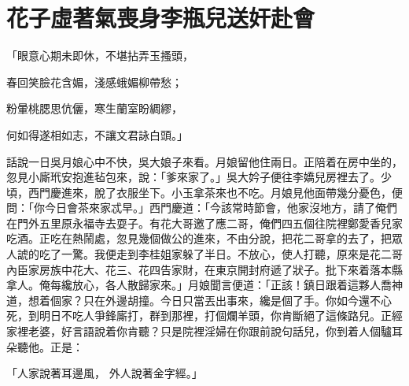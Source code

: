 %

\chapter{花子虛著氣喪身\KG 李瓶兒送奸赴會}

\begin{showcontents}{}



「眼意心期未即休，不堪拈弄玉搔頭，

春回笑臉花含媚，淺感蛾媚柳帶愁；

粉暈桃腮思伉儷，寒生蘭室盼綢繆，

何如得遂相如志，不讓文君詠白頭。」

話說一日吳月娘心中不快，吳大娘子來看。月娘留他住兩日。正陪着在房中坐的，忽見小廝玳安抱進毡包來，說：「爹來家了。」吳大妗子便往李嬌兒房裡去了。少頃，西門慶進來，脫了衣服坐下。小玉拿茶來也不吃。月娘見他面帶幾分憂色，便問：「你今日會茶來家忒早。」西門慶道：「今該常時節會，他家沒地方，請了俺們在門外五里原永福寺去耍子。有花大哥邀了應二哥，俺們四五個往院裡鄭愛香兒家吃酒。正吃在熱鬧處，忽見幾個做公的進來，不由分說，把花二哥拿的去了，把眾人諕的吃了一驚。我便走到李桂姐家躲了半日。不放心，使人打聽，原來是花二哥內臣家房族中花大、花三、花四告家財，在東京開封府遞了狀子。批下來着落本縣拿人。俺每纔放心，各人散歸家來。」月娘聞言便道：「正該！鎮日跟着這夥人喬神道，想着個家？只在外邊胡撞。今日只當丟出事來，纔是個了手。你如今還不心死，到明日不吃人爭鋒廝打，群到那裡，打個爛羊頭，你肯斷絕了這條路兒。正經家裡老婆，好言語說着你肯聽？只是院裡淫婦在你跟前說句話兒，你到着人個驢耳朵聽他。正是：

「人家說著耳邊風，  外人說著金字經。」


\end{showcontents}
